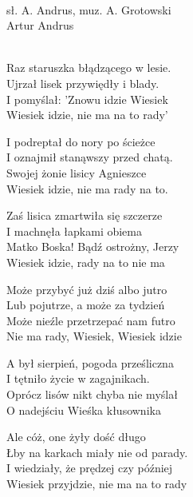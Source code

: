 \\
{sł. A. Andrus, muz. A. Grotowski}\\
{Artur Andrus}\\
\begin{text}\\
Raz staruszka błądzącego w lesie.\\
Ujrzał lisek przywiędły i blady.\\
I pomyślał: 'Znowu idzie Wiesiek\\
Wiesiek idzie, nie ma na to rady'

I podreptał do nory po ścieżce\\
I oznajmił stanąwszy przed chatą.\\
Swojej żonie lisicy Agnieszce\\
Wiesiek idzie, nie ma rady na to.

Zaś lisica zmartwiła się szczerze\\
I machnęła łapkami obiema\\
Matko Boska! Bądź ostrożny, Jerzy\\
Wiesiek idzie, rady na to nie ma

Może przybyć już dziś albo jutro\\
Lub pojutrze, a może za tydzień\\
Może nieźle przetrzepać nam futro\\
Nie ma rady, Wiesiek, Wiesiek idzie

A był sierpień, pogoda prześliczna\\
I tętniło życie w zagajnikach.\\
Oprócz lisów nikt chyba nie myślał\\
O nadejściu Wieśka kłusownika

Ale cóż, one żyły dość długo\\
Łby na karkach miały nie od parady.\\
I wiedziały, że prędzej czy później\\
Wiesiek przyjdzie, nie ma na to rady
\end{text}
\begin{chord}
\end{chord}